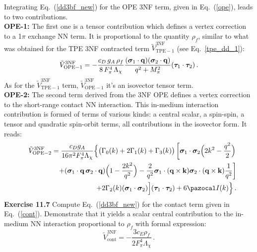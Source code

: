Integrating Eq.~(\ref{dd3bf_new}) for the OPE 3NF term, given in Eq.~(\ref{ope}), leads to two contributions.\\
{\bf OPE-1:} The first one is a tensor contribution which defines a vertex correction to a 1$\pi$ exchange NN term. It is proportional to the quantity $\rho_f$, similar to what was obtained for the TPE 3NF contracted term $\tilde V_\mathrm{TPE-1}^\mathrm{3NF}$ (see Eq.~\ref{tpe_dd_1}):
\begin{equation}
\tilde V_\mathrm{OPE-1}^\mathrm{3NF}=-\frac{c_D\,g_A\,\rho_f}{8\,F_\pi^4\,\Lambda_\chi}
\frac{(\boldsymbol\sigma_1\cdot{\bf q})(\boldsymbol\sigma_2\cdot{\bf q})}{q^2 + M_\pi^2}
(\boldsymbol\tau_1\cdot\boldsymbol\tau_2)\,.
\label{ope_dd_1}
\end{equation}
As for the $\tilde V_\mathrm{TPE-1}^\mathrm{3NF}$ term, $\tilde V_\mathrm{OPE-1}^\mathrm{3NF}$ it's an isovector tensor term.\\%
{\bf OPE-2:} The second term derived from the 3NF OPE defines a vertex correction to the short-range contact NN interaction.  This in-medium interaction contribution is formed of terms of various kinds: a central scalar, a  spin-spin, a tensor and quadratic spin-orbit terms, all contributions in the isovector form. It reads:
\begin{eqnarray}
\nonumber &&
\tilde V_\mathrm{OPE-2}^\mathrm{3NF}=\frac{c_Dg_A}{16\pi^2F_\pi^4\Lambda_\chi}\Big\{
\big(\Gamma_0(k)+2\Gamma_1(k)+\Gamma_3(k)\big)
\left[\boldsymbol\sigma_1\cdot\boldsymbol\sigma_2\Big(2k^2-\frac{q^2}{2}\Big)\right.
\\\nonumber && \left.\qquad
+(\boldsymbol\sigma_1\cdot{\bf q}\,\boldsymbol\sigma_2\cdot{\bf q})\Big(1-\frac{2k^2}{q^2}\Big)-\frac{2}{q^2}\boldsymbol\sigma_1\cdot({\bf q}\times{\bf k})
\boldsymbol\sigma_2\cdot({\bf q}\times{\bf k})\frac{1}{q^2}\right]
\\ && \qquad
+2\Gamma_2(k)(\boldsymbol\sigma_1\cdot\boldsymbol\sigma_2)\Big](\boldsymbol\tau_1\cdot\boldsymbol\tau_2)
+6{\pazocal I}(k)\Big\}\,.
\label{ope_dd_2}
\end{eqnarray}
\noindent
{\bf Exercise 11.7} Compute Eq.~(\ref{dd3bf_new}) for the contact term given in Eq.~(\ref{cont}). Demonstrate that it yields a scalar central contribution to the in-medium NN interaction proportional to $\rho_f$ with formal expression:
\begin{equation}
\tilde V_\mathrm{cont}^\mathrm{3NF}=-\frac{3 c_E\rho_f}{2 F_\pi^4\Lambda_\chi}\,.
\label{cont_dd}
\end{equation}
\\


